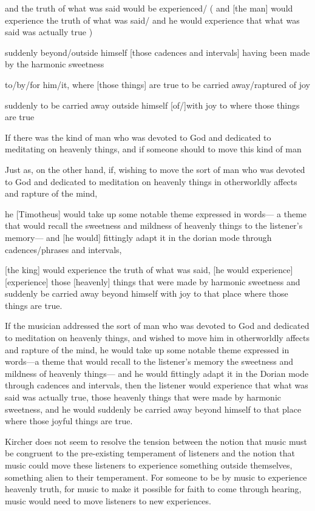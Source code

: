 and the truth of what was said would be experienced/
( and [the man] would experience the truth of what was said/
 and he would experience that what was said was actually true )

suddenly beyond/outside himself
[those cadences and intervals] having been made by the harmonic sweetness

to/by/for him/it,
where 
[those things] are true
to be carried away/raptured
of joy

suddenly to be carried away outside himself
[of/]with joy to where those things are true

If there was the kind of man who was devoted to God
and dedicated to meditating on heavenly things,
and if someone should to move this kind of man 

Just as, on the other hand, 
if, 
wishing to move the sort of man 
    who was devoted to God and dedicated to meditation on heavenly things
  in otherworldly affects and rapture of the mind,

he [Timotheus] would take up 
some notable theme expressed in words---
  a theme that would recall the sweetness and mildness of heavenly things
  to the listener's memory---
and [he would] fittingly adapt it 
  in the dorian mode through cadences/phrases and intervals,

[the king] would experience the truth of what was said,
[he would experience]
[experience] those [heavenly] things that were made by harmonic sweetness
and suddenly be carried away beyond himself with joy 
to that place where those things are true. 

If the musician addressed the sort of man who was devoted to God and dedicated to meditation on heavenly things,
and wished to move him in otherworldly affects and rapture of the mind,
he would take up some notable theme expressed in words---a theme that would recall to the listener's memory the sweetness and mildness of heavenly things---
and he would fittingly adapt it in the Dorian mode through cadences and intervals,
then the listener would experience that what was said was actually true,
those heavenly things that were made by harmonic sweetness,
and he would suddenly be carried away beyond himself to that place where those joyful things are true.



Kircher does not seem to resolve the tension between the notion that music must be congruent to the pre-existing temperament of listeners and the notion that music could move these listeners to experience something outside themselves, something alien to their temperament.
For someone to be  by music to experience heavenly truth, for music to make it possible for faith to come through hearing, music would need to move listeners to new experiences.



